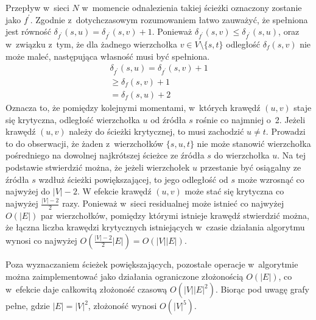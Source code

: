 {\begin{bproof}
    Przepływ w~sieci $N$ w~momencie odnalezienia takiej ścieżki oznaczony zostanie jako $f^\prime$.
    Zgodnie z~dotychczasowym rozumowaniem łatwo zauważyć, że spełniona jest równość $\delta_{f^\prime}(s, u)=\delta_{f^\prime}(s, v) + 1$.
    Ponieważ $\delta_{f^\prime}(s, v) \leq \delta_{f^\prime}(s, u)$, oraz w~związku z~tym, że dla żadnego wierzchołka $v \in V\setminus \{s, t\}$ odległość $\delta_f(s, v)$ nie może maleć, następująca własność musi być spełniona. \begin{align*}
        \delta_{f^\prime}(s,u)=\delta_{f^\prime}(s,v)+1\\
                           \geq\delta_f(s, v)+1\\
                              =\delta_f(s, u)+2
    \end{align*}
    Oznacza to, że pomiędzy kolejnymi momentami, w~których krawędź $(u, v)$ staje się krytyczna, odległość wierzchołka $u$ od źródła $s$ rośnie co najmniej o~2.
    Jeżeli krawędź $(u, v)$ należy do ścieżki krytycznej, to musi zachodzić $u \neq t$.
    Prowadzi to do obserwacji, że żaden z~wierzchołków $\{s, u, t\}$ nie może stanowić wierzchołka pośredniego na dowolnej najkrótszej ścieżce ze źródła $s$ do wierzchołka $u$.
    Na tej podstawie stwierdzić można, że jeżeli wierzchołek $u$ przestanie być osiągalny ze źródła $s$ wzdłuż ścieżki powiększającej, to jego odległość od $s$ może wzrosnąć co najwyżej do $|V|-2$.
    W efekcie krawędź $(u, v)$ może stać się krytyczna co najwyżej $\frac{|V|-2}{2}$ razy.
    Ponieważ w~sieci residualnej może istnieć co najwyżej $O(|E|)$ par wierzchołków, pomiędzy którymi istnieje krawędź stwierdzić można, że łączna liczba krawędzi krytycznych istniejących w~czasie działania algorytmu wynosi co najwyżej $O(\frac{|V|-2}{2}|E|)=O(|V||E|)$.
  \end{bproof}

  Poza wyznaczaniem ścieżek powiększających, pozostałe operacje w~algorytmie można zaimplementować jako działania ograniczone złożonością $O(|E|)$, co w~efekcie daje całkowitą złożoność czasową $O(|V||E|^2)$.
  Biorąc pod uwagę grafy pełne, gdzie $|E| = |V|^2$, złożoność wynosi $O(|V|^5)$.
}
